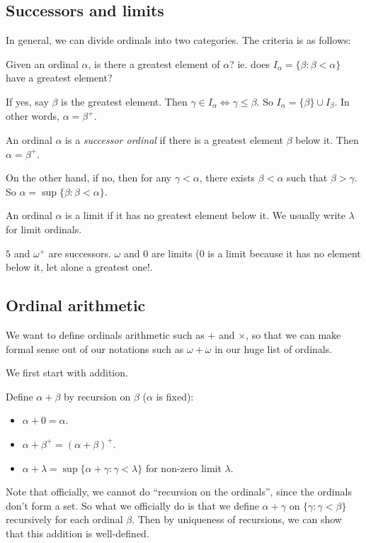 \documentclass[a4paper]{article}
\begin{document}
\subsection{Successors and limits}
In general, we can divide ordinals into two categories. The criteria is as follows:

Given an ordinal $\alpha$, is there a greatest element of $\alpha$? ie. does $I_\alpha = \{\beta: \beta < \alpha\}$ have a greatest element?

If yes, say $\beta$ is the greatest element. Then $\gamma\in I_\alpha \Leftrightarrow \gamma \leq \beta$. So $I_\alpha = \{\beta\}\cup I_\beta$. In other words, $\alpha = \beta^+$.

\begin{defi}
  An ordinal $\alpha$ is a \emph{successor ordinal} if there is a greatest element $\beta$ below it. Then $\alpha = \beta^+$.
\end{defi}

On the other hand, if no, then for any $\gamma < \alpha$, there exists $\beta < \alpha$ such that $\beta > \gamma$. So $\alpha = \sup \{\beta: \beta < \alpha\}$.
\begin{defi}
  An ordinal $\alpha$ is a limit if it has no greatest element below it. We usually write $\lambda$ for limit ordinals.
\end{defi}

\begin{eg}
  $5$ and $\omega^+$ are successors. $\omega$ and $0$ are limits ($0$ is a limit because it has no element below it, let alone a greatest one!.
\end{eg}

\subsection{Ordinal arithmetic}
We want to define ordinals arithmetic such as $+$ and $\times$, so that we can make formal sense out of our notations such as $\omega + \omega$ in our huge list of ordinals.

We first start with addition.
\begin{defi}
  Define $\alpha + \beta$ by recursion on $\beta$ ($\alpha$ is fixed):
  \begin{itemize}
    \item $\alpha + 0 = \alpha$.
    \item $\alpha + \beta^+ = (\alpha + \beta)^+$.
    \item $\alpha + \lambda = \sup \{\alpha + \gamma: \gamma < \lambda\}$ for non-zero limit $\lambda$.
  \end{itemize}
\end{defi}
Note that officially, we cannot do ``recursion on the ordinals'', since the ordinals don't form a set. So what we officially do is that we define $\alpha + \gamma$ on $\{\gamma: \gamma < \beta\}$ recursively for each ordinal $\beta$. Then by uniqueness of recursions, we can show that this addition is well-defined.
\end{document}
